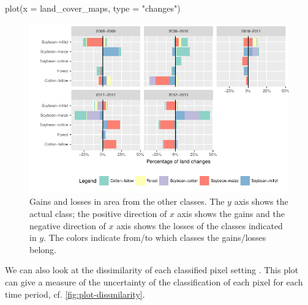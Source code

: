 \documentclass[article,shortnames]{jss}
\begin{document}
\begin{CodeChunk}
\begin{CodeInput}
plot(x = land_cover_maps, type = "changes")
\end{CodeInput}
\begin{figure}[!h]

{\centering \includegraphics{applying_twdtw_files/figure-latex/plot-change-1} 

}

\caption[Gains and losses in area from the other classes]{Gains and losses in area from the other classes. The $y$ axis shows the actual class; the positive direction of $x$ axis shows the gains and the negative direction of $x$ axis shows the losses of the classes indicated in $y$. The colors indicate from/to which classes the gains/losses belong.}\label{fig:plot-change}
\end{figure}
\end{CodeChunk}

We can also look at the dissimilarity of each classified pixel setting
. This plot can give a measure of the uncertainty
of the classification of each pixel for each time period, cf.
\autoref{fig:plot-dissmilarity}.
\end{document}
